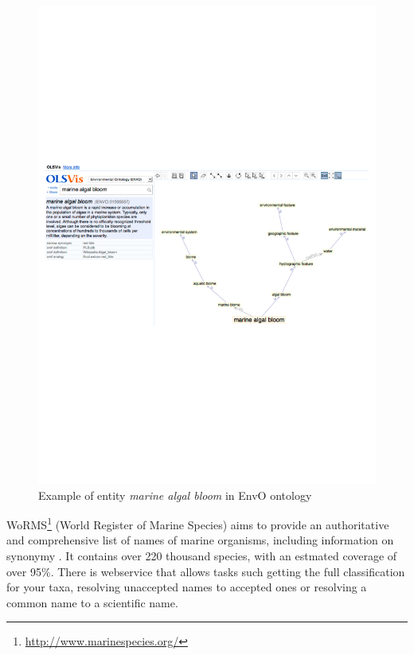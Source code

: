 \begin{figure}
\begin{center}
\includegraphics[scale=0.6]{figures/envo-example.pdf}
 \caption{Example of entity \emph{marine algal bloom} in EnvO ontology}
\label{fig:envo-example}
\end{center}
\end{figure}


WoRMS\footnote{\url{http://www.marinespecies.org/}}  (World Register of Marine Species) aims to provide an authoritative and comprehensive list of names of marine organisms, including information on synonymy \citep{Costello2013Global}.
It contains over 220 thousand species, with an estmated coverage of over 95\%.
There is webservice that allows tasks such getting the full classification for your taxa, resolving unaccepted names to accepted ones or resolving a common name to a scientific name.

